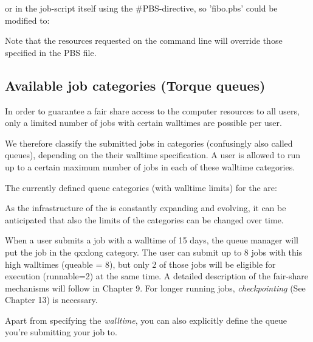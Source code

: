 \begin{prompt}
\end{prompt}

or in the job-script itself using the \#PBS-directive, so 'fibo.pbs' could be modified to:


Note that the resources requested on the command line will override those
specified in the PBS file.

\subsection{Available job categories (Torque queues)}

In order to guarantee a fair share access to the computer resources to all
users, only a limited number of jobs with certain walltimes are possible per
user.

We therefore classify the submitted jobs in categories (confusingly also called
queues), depending on the their walltime specification.  A user is allowed to
run up to a certain maximum number of jobs in each of these walltime
categories.

The currently defined queue categories (with walltime limits) for the \hpc
are:


 As the infrastructure of the \hpc is constantly expanding
and evolving, it can be anticipated that also the limits of the categories can
be changed over time.

\ifantwerpen
When a user submits a job with a walltime of 15 days, the queue manager will
put the job in the qxxlong category.  The user can submit up to 8 jobs with
this high walltimes (queable = 8), but only 2 of those jobs will be eligible
for execution (runnable=2) at the same time.  A detailed description of the
fair-share mechanisms will follow in Chapter 9. For longer running jobs,
\emph{checkpointing} (See Chapter 13) is necessary.
\fi

Apart from specifying the \emph{walltime}, you can also explicitly define the
queue you're submitting your job to.

